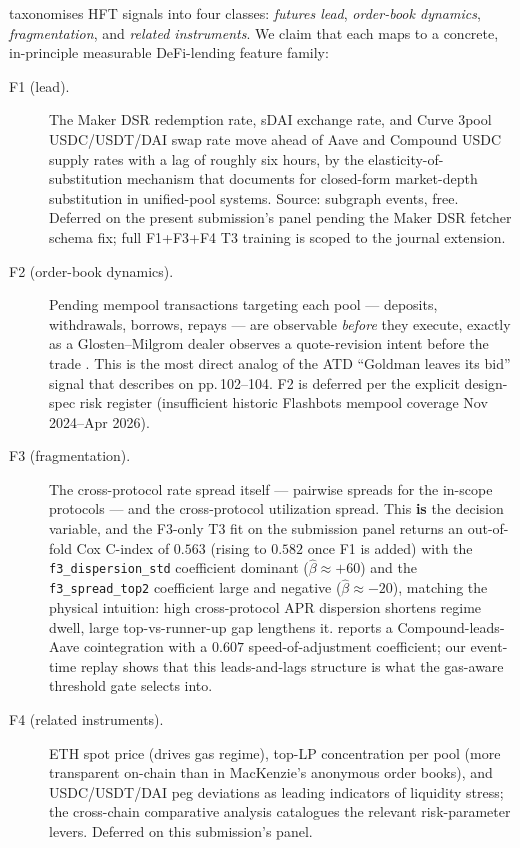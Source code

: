 \cite[Table 3.2, p.\,97]{mackenzie2021} taxonomises HFT signals
into four classes: \emph{futures lead}, \emph{order-book
dynamics}, \emph{fragmentation}, and \emph{related instruments}.
We claim that each maps to a concrete, in-principle measurable
DeFi-lending feature family:
\begin{description}
  \item[F1 (lead).] The Maker DSR redemption rate, sDAI exchange
    rate, and Curve 3pool USDC/USDT/DAI swap rate move ahead of
    Aave and Compound USDC supply rates with a lag of roughly six
    hours, by the elasticity-of-substitution mechanism that
    \cite{krause2005} documents for closed-form market-depth
    substitution in unified-pool systems.  Source: subgraph
    events, free.  Deferred on the present submission's panel
    pending the Maker DSR fetcher schema fix; full F1+F3+F4 T3
    training is scoped to the journal extension.
  \item[F2 (order-book dynamics).] Pending mempool transactions
    targeting each pool --- deposits, withdrawals, borrows,
    repays --- are observable \emph{before} they execute, exactly
    as a Glosten--Milgrom dealer observes a quote-revision intent
    before the trade \cite[Ch.\,3]{ohara1995}.  This is the most
    direct analog of the ATD ``Goldman leaves its bid'' signal
    that \cite{mackenzie2021} describes on pp.\,102--104.  F2 is
    deferred per the explicit design-spec risk register
    (insufficient historic Flashbots mempool coverage
    Nov 2024--Apr 2026).
  \item[F3 (fragmentation).] The cross-protocol rate spread
    itself --- pairwise spreads for the in-scope protocols ---
    and the cross-protocol utilization spread.  This \textbf{is}
    the decision variable, and the F3-only T3 fit on the
    submission panel returns an out-of-fold Cox C-index of $0.563$
    (rising to $0.582$ once F1 is added) with the
    \texttt{f3\_dispersion\_std} coefficient dominant
    ($\hat{\beta} \approx +60$) and the
    \texttt{f3\_spread\_top2} coefficient large and negative
    ($\hat{\beta} \approx -20$), matching the physical
    intuition: high cross-protocol APR dispersion shortens regime
    dwell, large top-vs-runner-up gap lengthens it.
    \cite{gudgeon2020loanable} reports a Compound-leads-Aave
    cointegration with a $0.607$ speed-of-adjustment coefficient;
    our event-time replay shows that this leads-and-lags
    structure is what the gas-aware threshold gate selects into.
  \item[F4 (related instruments).] ETH spot price (drives gas
    regime), top-LP concentration per pool (more transparent
    on-chain than in MacKenzie's anonymous order books), and
    USDC/USDT/DAI peg deviations as leading indicators of
    liquidity stress; the
    \cite{aavecompoundcrosschain2025} cross-chain comparative
    analysis catalogues the relevant risk-parameter levers.
    Deferred on this submission's panel.
\end{description}
